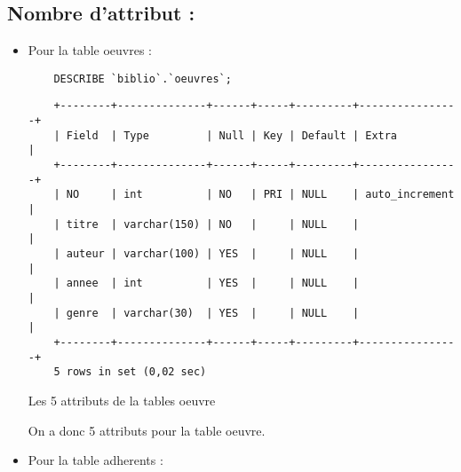 \documentclass{article}
\begin{document}
\subsection{Nombre d'attribut :}
\begin{itemize}
	\item Pour la table oeuvres :
	      \begin{listing}[H]
		      \begin{verbatim}
	DESCRIBE `biblio`.`oeuvres`;
	\end{verbatim}
		      \begin{verbatim}
	+--------+--------------+------+-----+---------+----------------+
	| Field  | Type         | Null | Key | Default | Extra          |
	+--------+--------------+------+-----+---------+----------------+
	| NO     | int          | NO   | PRI | NULL    | auto_increment |
	| titre  | varchar(150) | NO   |     | NULL    |                |
	| auteur | varchar(100) | YES  |     | NULL    |                |
	| annee  | int          | YES  |     | NULL    |                |
	| genre  | varchar(30)  | YES  |     | NULL    |                |
	+--------+--------------+------+-----+---------+----------------+
	5 rows in set (0,02 sec)
	\end{verbatim}
		      \caption{Les 5 attributs de la tables oeuvre}
	      \end{listing}
	      On a donc 5 attributs pour la table oeuvre.

	\item Pour la table adherents :
	      \begin{listing}[H]


\end{listing}
\end{itemize}
\end{document}
